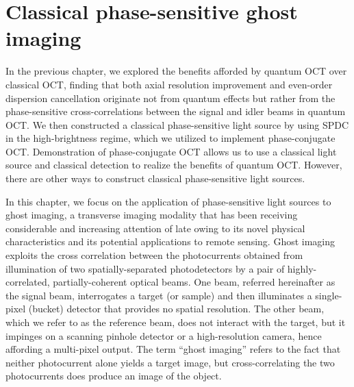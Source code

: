 \chapter{Classical phase-sensitive ghost imaging}
In the previous chapter, we explored the benefits afforded by quantum OCT over classical OCT, finding that both axial resolution improvement and even-order dispersion cancellation originate not from quantum effects but rather from the phase-sensitive cross-correlations between the signal and idler beams in quantum OCT. We then constructed a classical phase-sensitive light source by using SPDC in the high-brightness regime, which we utilized to implement phase-conjugate OCT. Demonstration of phase-conjugate OCT allows us to use a classical light source and classical detection to realize the benefits of quantum OCT. However, there are other ways to construct classical phase-sensitive light sources.

In this chapter, we focus on the application of phase-sensitive light sources to ghost imaging, a transverse imaging modality that has been receiving considerable and increasing attention of late owing to its novel physical characteristics and its potential applications to remote sensing. Ghost imaging exploits the cross correlation between the photocurrents obtained from illumination of two spatially-separated photodetectors by a pair of highly-correlated, partially-coherent optical beams. One beam, referred hereinafter as the signal beam, interrogates a target (or sample) and then illuminates a single-pixel (bucket) detector that provides no spatial resolution. The other beam, which we refer to as the reference beam, does not interact with the target, but it impinges on a scanning pinhole detector or a high-resolution camera, hence affording a multi-pixel output. The term ``ghost imaging'' refers to the fact that neither photocurrent alone yields a target image, but cross-correlating the two photocurrents does produce an image of the object.  

